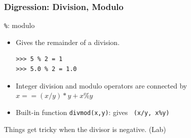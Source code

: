 \documentclass{beamer}
\begin{document}
\begin{frame}[fragile]
\frametitle{Digression: Division, Modulo }

\begin{block}{ \texttt{\%}: modulo}
\begin{itemize}
\item Gives the remainder of a division. 
\begin{verbatim}
>>> 5 % 2 = 1
>>> 5.0 % 2 = 1.0
\end{verbatim}
\item Integer division and modulo operators are connected by $x== ( x / y )*y+x \% y$
\item Built-in function \texttt{divmod(x,y)}: gives \texttt{ (x/y, x\%y)} 
\end{itemize}
\end{block}
Things get tricky when the divisor is negative. (Lab)
\end{frame}
\end{document}
